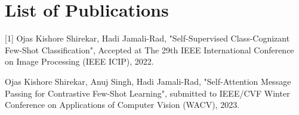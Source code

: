 \chapter*{List of Publications}

[1] Ojas Kishore Shirekar, Hadi Jamali-Rad, "Self-Supervised Class-Cognizant Few-Shot Classification", Accepted at The 29th IEEE International Conference on Image Processing (IEEE ICIP), 2022.

\noindent [2] Ojas Kishore Shirekar, Anuj Singh, Hadi Jamali-Rad, "Self-Attention Message Passing for Contrastive Few-Shot Learning", submitted to IEEE/CVF Winter Conference on Applications of Computer Vision (WACV), 2023.
